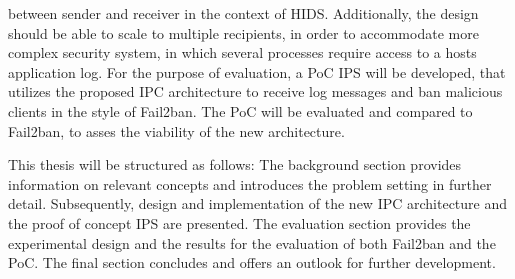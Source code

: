 between sender and receiver in the context of \ac{HIDS}. Additionally, the design should be able to scale to multiple
recipients, in order to accommodate more complex security system, in which several processes
require access to a hosts application log. For the purpose of evaluation, a \ac{PoC} \ac{IPS} will be 
developed, that utilizes the proposed \ac{IPC} architecture to receive log messages and ban malicious
clients in the style of Fail2ban. The \ac{PoC} will be evaluated and compared to Fail2ban, to asses the viability of the new architecture. 
\par 
This thesis will be structured as follows: The background section provides 
information on relevant concepts and introduces the problem setting in further detail. Subsequently, design and implementation
of the new \ac{IPC} architecture and the proof of concept \ac{IPS} are presented. The evaluation section provides the experimental design and the results for the 
evaluation of both Fail2ban and the \ac{PoC}. The final section concludes and offers an outlook for further development.   